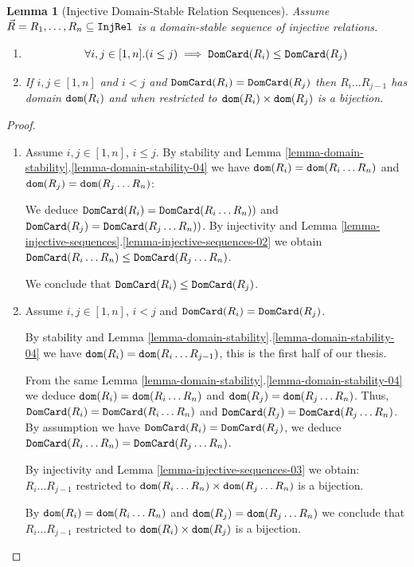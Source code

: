 \documentclass{lmcs}
\newtheorem{lemma}[theorem]{Lemma}
\begin{document}
\begin{lemma}[Injective Domain-Stable Relation Sequences]
\label{lemma-injective-stable-sequences}
Assume $\vec{R}=R_1, \ldots, R_n \subseteq {\tt InjRel}$ is a \emph{domain-stable}
sequence of injective relations.
\begin{enumerate}

\item
\label{lemma-injective-stable-sequences-01}
$$
\forall i,j \in [1,n]. (i \le j) \implies {\tt DomCard}(R_i) \le {\tt DomCard}(R_j)
$$

\item
\label{lemma-injective-stable-sequences-02}
If  $i, j \in[1,n]$ and $i < j$ and ${\tt DomCard}(R_i) = {\tt DomCard}(R_j)$ then $R_i \ldots R_{j-1}$ 
has domain ${\tt dom}(R_i)$ and when restricted to ${\tt dom}(R_i) \times {\tt dom}(R_j)$ is a bijection.
\end{enumerate}
\end{lemma}


\begin{proof}
\begin{enumerate}

\item
Assume $i,j \in [1,n]$, $i \le j$. By stability and
Lemma \ref{lemma-domain-stability}.\ref{lemma-domain-stability-04}
we have ${\tt dom}(R_i) = {\tt dom}(R_i \ldots R_n)$ and  ${\tt dom}(R_j) = {\tt dom}(R_j \ldots R_n)$:

We deduce ${\tt DomCard}(R_i) = {\tt DomCard}(R_i \ldots R_n))$ and
${\tt DomCard}(R_j) = {\tt DomCard}(R_j \ldots R_n))$. By injectivity and 
Lemma \ref{lemma-injective-sequences}.\ref{lemma-injective-sequences-02}  
we obtain ${\tt DomCard}(R_i \ldots R_n) \le {\tt DomCard}(R_j \ldots R_n)$.

We conclude that ${\tt DomCard}(R_i) \le {\tt DomCard}(R_j)$.

\item
Assume $i,j \in [1,n]$, $i < j$ and ${\tt DomCard}(R_i) = {\tt DomCard}(R_j)$.

By stability and
Lemma \ref{lemma-domain-stability}.\ref{lemma-domain-stability-04}
we have ${\tt dom}(R_i) = {\tt dom}(R_i \ldots R_{j-1})$, this is the first half of our thesis.

From the same Lemma \ref{lemma-domain-stability}.\ref{lemma-domain-stability-04}
we deduce ${\tt dom}(R_i) = {\tt dom}(R_i \ldots R_n)$ and ${\tt dom}(R_j) = {\tt dom}(R_j \ldots R_n)$. 
Thus, ${\tt DomCard}(R_i) = {\tt DomCard}(R_i \ldots R_n)$ and
${\tt DomCard}(R_j) = {\tt DomCard}(R_j \ldots R_n)$. 
By assumption we have ${\tt DomCard}(R_i) = {\tt DomCard}(R_j)$,
we deduce $ {\tt DomCard}(R_i \ldots R_n) = {\tt DomCard}(R_j \ldots R_n)$.

By injectivity and Lemma \ref{lemma-injective-sequences-03} we obtain: 
$R_i \ldots R_{j-1}$ restricted to ${\tt dom}(R_i \ldots R_n) \times {\tt dom}(R_j \ldots R_n)$
is a bijection. 

By ${\tt dom}(R_i) = {\tt dom}(R_i \ldots R_n)$ and 
${\tt dom}(R_j) = {\tt dom}(R_j \ldots R_n)$ we conclude that
$R_i \ldots R_{j-1}$ restricted to ${\tt dom}(R_i) \times {\tt dom}(R_j)$
is a bijection. 
\end{enumerate}

\end{proof}
\end{document}
